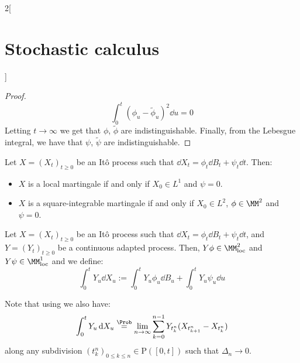 \documentclass[../../../main_math.tex]{subfiles}
\begin{document}
\begin{multicols}{2}[\section{Stochastic calculus}]
\begin{proof}
    $$
      \int_0^t{(\phi_u-\tilde{\phi}_u)}^2\dd{u}=0
    $$
    Letting $t\to \infty$ we get that $\phi$, $\tilde{\phi}$ are indistinguishable. Finally, from the Lebesgue integral, we have that $\psi$, $\tilde{\psi}$ are indistinguishable.
  \end{proof}
  \begin{proposition}\label{SC:ito_process_martingale}
    Let $X={(X_t)}_{t\geq 0}$ be an Itô process such that $\dd{X_t}=\phi_t\dd{B_t}+\psi_t\dd{t}$. Then:
    \begin{itemize}
      \item $X$ is a local martingale if and only if $X_0\in L^1$ and $\psi=0$.
      \item $X$ is a square-integrable martingale if and only if $X_0\in L^2$, $\phi\in\MM^2$ and $\psi=0$.
    \end{itemize}
  \end{proposition}
  \begin{definition}
    Let $X={(X_t)}_{t\geq 0}$ be an Itô process such that $\dd{X_t}=\phi_t\dd{B_t}+\psi_t\dd{t}$, and $Y={(Y_t)}_{t\geq 0}$ be a continuous adapted process. Then, $Y\phi\in \MM^2_{\text{loc}}$ and $Y\psi\in \MM^1_{\text{loc}}$ and we define:
    $$
      \int_0^tY_u \dd{X_u}:=\int_0^t Y_u\phi_u\dd{B_u}+\int_0^t Y_u\psi_u\dd{u}
    $$
  \end{definition}
  \begin{remark}
    Note that using  we also have:
    $$
      \int_0^tY_u \dd{X_u}\overset{\Prob}{=}\lim_{n\to\infty} \sum_{k=0}^{n-1}Y_{t_k^n}(X_{t_{k+1}^n}-X_{t_k^n})
    $$
    along any subdivision ${(t_k^n)}_{0\leq k\leq n}\in \mathrm{P}([0,t])$ such that $\Delta_n\to 0$.
  \end{remark}

\end{multicols}
\end{document}
